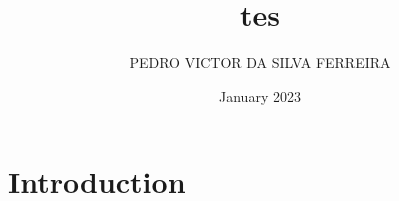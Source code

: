 \documentclass{article}
\title{tes}
\author{PEDRO VICTOR DA SILVA FERREIRA}
\date{January 2023}
\begin{document}
\maketitle

\section{Introduction}
\end{document}
